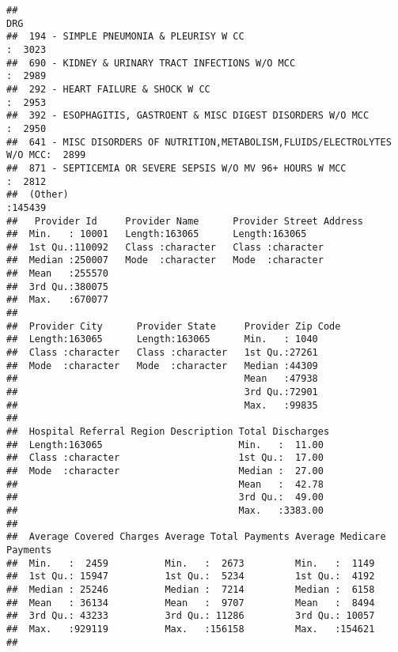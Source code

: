 \documentclass[]{article}
\begin{document}
\begin{verbatim}
##                                                                        DRG        
##  194 - SIMPLE PNEUMONIA & PLEURISY W CC                                  :  3023  
##  690 - KIDNEY & URINARY TRACT INFECTIONS W/O MCC                         :  2989  
##  292 - HEART FAILURE & SHOCK W CC                                        :  2953  
##  392 - ESOPHAGITIS, GASTROENT & MISC DIGEST DISORDERS W/O MCC            :  2950  
##  641 - MISC DISORDERS OF NUTRITION,METABOLISM,FLUIDS/ELECTROLYTES W/O MCC:  2899  
##  871 - SEPTICEMIA OR SEVERE SEPSIS W/O MV 96+ HOURS W MCC                :  2812  
##  (Other)                                                                 :145439  
##   Provider Id     Provider Name      Provider Street Address
##  Min.   : 10001   Length:163065      Length:163065          
##  1st Qu.:110092   Class :character   Class :character       
##  Median :250007   Mode  :character   Mode  :character       
##  Mean   :255570                                             
##  3rd Qu.:380075                                             
##  Max.   :670077                                             
##                                                             
##  Provider City      Provider State     Provider Zip Code
##  Length:163065      Length:163065      Min.   : 1040    
##  Class :character   Class :character   1st Qu.:27261    
##  Mode  :character   Mode  :character   Median :44309    
##                                        Mean   :47938    
##                                        3rd Qu.:72901    
##                                        Max.   :99835    
##                                                         
##  Hospital Referral Region Description Total Discharges 
##  Length:163065                        Min.   :  11.00  
##  Class :character                     1st Qu.:  17.00  
##  Mode  :character                     Median :  27.00  
##                                       Mean   :  42.78  
##                                       3rd Qu.:  49.00  
##                                       Max.   :3383.00  
##                                                        
##  Average Covered Charges Average Total Payments Average Medicare Payments
##  Min.   :  2459          Min.   :  2673         Min.   :  1149           
##  1st Qu.: 15947          1st Qu.:  5234         1st Qu.:  4192           
##  Median : 25246          Median :  7214         Median :  6158           
##  Mean   : 36134          Mean   :  9707         Mean   :  8494           
##  3rd Qu.: 43233          3rd Qu.: 11286         3rd Qu.: 10057           
##  Max.   :929119          Max.   :156158         Max.   :154621           
## 
\end{verbatim}
\end{document}
